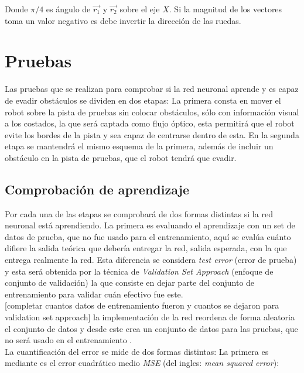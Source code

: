 \documentclass{iccmemoria}
\begin{document}
Donde $\pi/4$ es ángulo de $\vec{r_{1}}$ y $\vec{r_{2}}$ sobre el eje $X$. Si la magnitud de los vectores toma un valor negativo es debe invertir la dirección de las ruedas.\\

\chapter{Pruebas}

Las pruebas que se realizan para comprobar si la red neuronal aprende y es capaz de evadir obstáculos se dividen en dos etapas: La primera consta en mover el robot sobre la pista de pruebas sin colocar obstáculos, sólo con información visual a los costados, la que será captada como flujo óptico, esta permitirá que el robot evite los bordes de la pista y sea capaz de centrarse dentro de esta. En la segunda etapa se mantendrá el mismo esquema de la primera, además de incluir un obstáculo en la pista de pruebas, que el robot tendrá que evadir.\\

\section{Comprobación de aprendizaje}

Por cada una de las etapas se comprobará de dos formas distintas si la red neuronal está aprendiendo. La primera es evaluando el aprendizaje con un set de datos de prueba, que no fue usado para el entrenamiento, aquí se evalúa cuánto difiere la salida teórica que debería entregar la red, salida esperada, con la que entrega realmente la red. Esta diferencia se considera \emph{test error} (error de prueba) y esta será obtenida por la técnica de \emph{Validation Set Approach} (enfoque de conjunto de validación) la que consiste en dejar parte del conjunto de entrenamiento para validar cuán efectivo fue este.\\
 
[completar cuantos datos de entrenamiento fueron y cuantos se dejaron para validation set approach]
la implementación de la red reordena de forma aleatoria el conjunto de datos y desde este crea un conjunto de datos para las pruebas, que no será usado en el entrenamiento \cite{james2014introduction}.\\
 
La cuantificación del error se mide de dos formas distintas: La primera es mediante es el error cuadrático medio \emph{MSE} (del ingles: \emph{mean squared error}):\\
\end{document}
